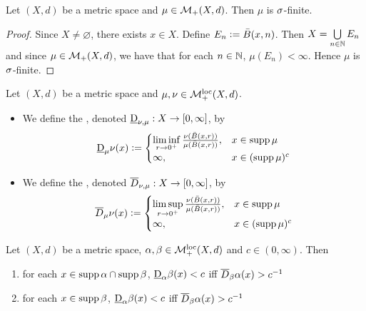 \documentclass{book}
\begin{document}
	\begin{ex} 
		Let $(X, d)$ be a metric space and $\mu \in \mathcal{M}_+(X, d)$. Then $\mu$ is $\sigma$-finite. 
	\end{ex}

	\begin{proof}
		Since $X \neq \varnothing$, there exists $x \in X$. Define $E_n \vcentcolon= \bar{B}(x, n)$. Then $X = \bigcup\limits_{n \in \mathbb{N}} E_n$ and since $\mu \in \mathcal{M}_+(X, d)$, we have that for each $n \in \mathbb{N}$, $\mu(E_n) < \infty$. Hence $\mu$ is $\sigma$-finite.
	\end{proof}
	
	\begin{defn} 
		Let $(X, d)$ be a metric space and $\mu, \nu \in \mathcal{M}_+^{\text{loc}}(X, d)$. 
		\begin{itemize}
			\item We define the , denoted $\underbar{D}_{\nu, \mu}: X \rightarrow [0,\infty]$, by
			\[
			\underbar{D}_{\mu}\nu(x) \vcentcolon=
			\begin{cases}
				\liminf\limits_{r \rightarrow 0^+} \frac{\nu(\bar{B}(x, r))}{\mu(\bar{B}(x, r))}, & x \in \operatorname{supp} \mu \\
				\infty, & x \in (\operatorname{supp} \mu)^c  
			\end{cases}
			\]
			\item We define the , denoted $\overline{D}_{\nu, \mu}: X \rightarrow [0,\infty]$, by 
			\[
			\overline{D}_{\mu}\nu(x) \vcentcolon=
			\begin{cases}
				\limsup\limits_{r \rightarrow 0^+} \frac{\nu(\bar{B}(x, r))}{\mu(\bar{B}(x, r))}, & x \in \operatorname{supp} \mu \\
				\infty, & x \in (\operatorname{supp} \mu)^c    
			\end{cases}
			\]
		\end{itemize}
	\end{defn}

	\begin{ex} 
		Let $(X, d)$ be a metric space, $\alpha, \beta \in \mathcal{M}_+^{\text{loc}}(X, d)$ and $c \in (0,\infty)$. Then 
		\begin{enumerate}
			\item for each $x \in \operatorname{supp} \alpha \cap \operatorname{supp} \beta$, $\underbar{D}_{\alpha} \beta (x) < c$ iff $\overline{D}_{\beta}\alpha(x) > c^{-1}$
			\item for each $x \in \operatorname{supp} \beta$, $\underbar{D}_{\alpha} \beta (x) < c$ iff $\overline{D}_{\beta}\alpha(x) > c^{-1}$
		\end{enumerate} 
	\end{ex}
\end{document}
